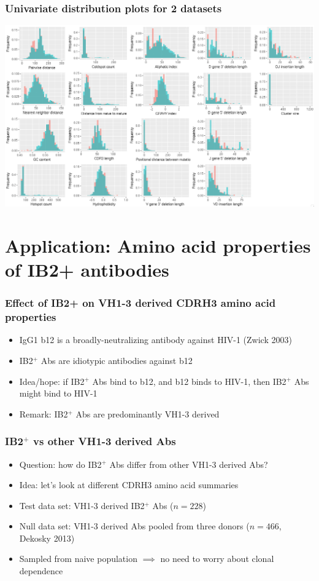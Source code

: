 \documentclass[mathserif,compress]{beamer}
\renewcommand\;{\,}
\begin{document}
\begin{frame}\frametitle{Univariate distribution plots for 2 datasets}
\begin{center}
\includegraphics[width=\linewidth]{Images/Dual_summaries.png}
\end{center}
\end{frame}


\section{Application: Amino acid properties of IB2+ antibodies}

\begin{frame}\frametitle{Effect of IB2+ on VH1-3 derived CDRH3 amino acid properties}
\begin{itemize}
\item
IgG1 b12 is a broadly-neutralizing antibody against HIV-1 (Zwick 2003)
 \bigskip
 \item
IB2$^+$ Abs are idiotypic antibodies against b12
\bigskip
\item
Idea/hope: if IB2$^+$ Abs bind to b12, and b12 binds to HIV-1, then IB2$^+$ Abs might bind to HIV-1 
\bigskip
\item
Remark: IB2$^+$ Abs are predominantly VH1-3 derived
\end{itemize}
\end{frame}

\begin{frame}\frametitle{IB2$^+$ vs other VH1-3 derived Abs}
\begin{itemize}
\item
Question: how do IB2$^+$ Abs differ from other VH1-3 derived Abs?
\bigskip
\item
Idea: let's look at different CDRH3 amino acid summaries
\bigskip
\item
Test data set: VH1-3 derived IB2$^+$ Abs ($n = 228$)
\bigskip
\item
Null data set: VH1-3 derived Abs pooled from three donors ($n = 466$, Dekosky 2013)
\bigskip
\item
Sampled from naive population $\implies $ no need to worry about clonal dependence 
\end{itemize}
\end{frame}
\end{document}
